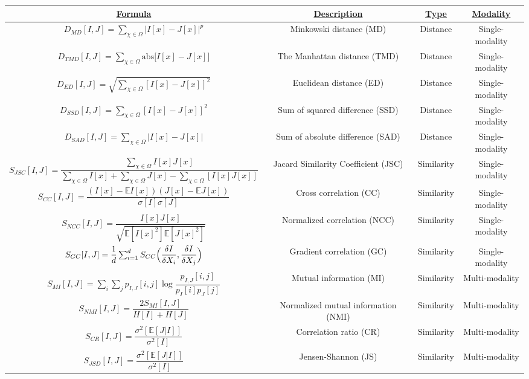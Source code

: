 \documentclass[10pt]{article}[draft]
\begin{document}
		
	   \begin{landscape}
		\begin{table}
		\begin{tabular}{|c|c|c|c|}
				\hline 
			\underline{Formula} 								&  \underline{Description} & \underline{Type} & \underline{Modality}\\
			\hline
			$D_{MD} [I,J] = {\sum_{\chi \in \Omega}  \biggl|I[x] - J[x]\biggl|^p}$		 & Minkowski distance (MD) & Distance & Single-modality  \\
			\hline
			$D_{TMD} [I,J] = {\sum_{\chi \in \Omega} \text{abs} \biggl[I[x] - J[x]\biggl]}$		 & The Manhattan distance (TMD) & Distance & Single-modality \\
		\hline 
		$D_{ED} [I,J] = \sqrt{\sum_{\chi \in \Omega} [I[x] - J[x]]^2}$		 & Euclidean distance (ED) & Distance & Single-modality \\
		\hline
		$D_{SSD} [I,J] = \sum_{\chi \in \Omega} [I[x] - J[x]]^2$		 & Sum of squared difference (SSD) & Distance & Single-modality \\
		\hline
		$D_{SAD} [I,J] = \sum_{\chi \in \Omega} | I[x] - J[x] |$		 & Sum of absolute difference (SAD) & Distance & Single-modality \\
			\hline
		$S_{JSC} [I,J] = \dfrac{\sum_{\chi \in \Omega} I[x] J[x]}{  \sum_{\chi \in \Omega} I[x] + \sum_{\chi \in \Omega} J[x]  - \sum_{\chi \in \Omega} [ I[x] J[x] ]}$		 &  Jacard Similarity Coefficient (JSC) & Similarity & Single-modality  \\
		\hline
		$S_{CC} [I,J] = \dfrac{(I[x] -\mathbb{E}  I[x] ) (J[x] - \mathbb{E} J[x])}{{\sigma[I]} \sigma[J]}$		 &  Cross correlation (CC) & Similarity & Single-modality  \\
		\hline
		$S_{NCC} [I,J] = \dfrac{I[x] J[x]}{\sqrt{\mathbb{E} [I[x]^2] \mathbb{E} [J[x]^2]}}$		 &  Normalized  correlation (NCC) & Similarity & Single-modality \\
		\hline
		$S_{GC} [I,J] = \dfrac{1}{d} \sum_{i=1}^d S_{CC}\Bigl( \dfrac{\delta I}{\delta X_i}, \dfrac{\delta I}{\delta X_j} \Bigl)$		 & Gradient  correlation (GC) & Similarity & Single-modality \\
		\hline
		$S_{MI} [I,J] =  \sum_{i} \sum_{j} p_{I,J} [i,j] \log \dfrac{p_{I,J} [i,j] }{p_{I} [i]  p_{J} [j] }$		 & Mutual  information (MI) & Similarity & Multi-modality \\
		\hline
		$S_{NMI} [I,J] = \dfrac{2 S_{MI} [I,J] }{H[I] + H[J]}$		 & Normalized mutual  information (NMI) & Similarity & Multi-modality \\
		\hline
		$S_{CR} [I,J] = \dfrac{\sigma^2[\mathbb{E}[J|I]]}{\sigma^2[I]}$		 & Correlation ratio (CR) & Similarity & Multi-modality \\
		\hline
			$S_{JSD} [I,J] = \dfrac{\sigma^2[\mathbb{E}[J|I]]}{\sigma^2[I]}$		 & Jensen-Shannon (JS) & Similarity & Multi-modality \\
		\hline
		\end{tabular}
	   \end{table}
  \end{landscape}
	
\end{document}
